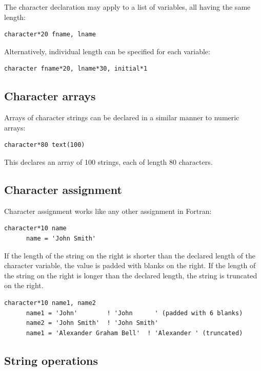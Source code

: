 The character declaration may apply to a list of variables, all having the same length:

\begin{lstlisting}[style=fortran77]
      character*20 fname, lname
\end{lstlisting}

Alternatively, individual length can be specified for each variable:

\begin{lstlisting}[style=fortran77]
      character fname*20, lname*30, initial*1
\end{lstlisting}

\subsection{Character arrays}

Arrays of character strings can be declared in a similar manner to numeric arrays:

\begin{lstlisting}[style=fortran77]
      character*80 text(100)
\end{lstlisting}

This declares an array of 100 strings, each of length 80 characters.

\subsection{Character assignment}

Character assignment works like any other assignment in Fortran:

\begin{lstlisting}[style=fortran77]
      character*10 name
      name = 'John Smith'
\end{lstlisting}

If the length of the string on the right is shorter than the declared length of the character variable, the value is padded with blanks on the right. If the length of the string on the right is longer than the declared length, the string is truncated on the right.

\begin{lstlisting}[style=fortran77]
      character*10 name1, name2
      name1 = 'John'        ! 'John      ' (padded with 6 blanks)
      name2 = 'John Smith'  ! 'John Smith'
      name1 = 'Alexander Graham Bell'  ! 'Alexander ' (truncated)
\end{lstlisting}

\subsection{String operations}

